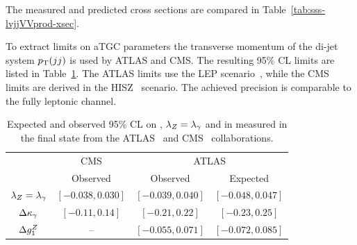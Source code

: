 The measured and predicted cross sections are compared in Table~\ref{tab:sss-lvjjVVprod-xsec}. 
\begin{table}[htp]
\begin{center}
\caption{Summary of measured total $\WZ+\WW$ production cross sections from ATLAS and CMS
at 7 TeV centre-of-mass energies in the \WVlvqq\; final state.}
\end{center}
\label{tab:sss-lvjjVVprod-xsec}
\end{table}

%

To extract limits on aTGC parameters the transverse momentum of the di-jet system $p_{\mathrm{T}}(jj)$ is used 
by ATLAS and CMS. The resulting 95\% CL limits are listed in Table~\ref{tab:sss-lvjjVVprod-ATGC}. The ATLAS
limits use the LEP scenario~\cite{Gounaris:1996rz}, while the CMS limits are derived in the HISZ~\cite{HAGIWARA1992353,PhysRevD.48.2182} scenario. The achieved precision is comparable to the fully leptonic
channel.

\begin{table}\centering
\caption{Expected and observed 95\% CL on \dkg, $\lambda_Z=\lambda_\gamma$ and \dgz in measured in the 
\WVlvqq\; final state from the ATLAS~\cite{Aad:2014mda} and CMS~\cite{Chatrchyan:2012bd} 
collaborations.}
\label{tab:sss-lvjjVVprod-ATGC}
\begin{tabular}{cccc}
\hline
 & CMS & \multicolumn{2}{c}{ATLAS}   \\ 
 & Observed & Observed & Expected \\
\hline
$\lambda_Z=\lambda_\gamma$ & $[-0.038, 0.030]$ & $[-0.039, 0.040]$ & $[-0.048, 0.047]$ \\
$\Delta \kappa_\gamma$ 	  & $[-0.11, 0.14]$ & $[-0.21,0.22]$ & $[-0.23,0.25]$ \\
$\Delta g_1^Z$   & \--- & $[-0.055, 0.071]$ & $[-0.072, 0.085]$ \\
\hline
\end{tabular}
\end{table}



